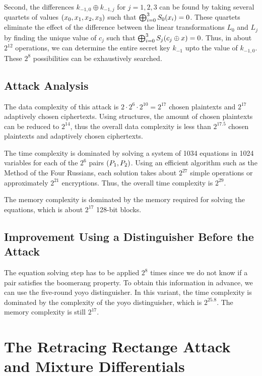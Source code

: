 \documentclass[twoside]{article}
\begin{document}
Second, the differences \(k_{-1, 0} \oplus k_{-1, j}\) for \(j = 1, 2, 3\) can
be found by taking several quartets of values \((x_0, x_1, x_2, x_3)\) such
that \(\bigoplus_{i=0}^3S_0(x_i) = 0\). These quartets eliminate the effect
of the difference between the linear transformations \(L_0\) and \(L_j\) by
finding the unique value of \(c_j\) such that \(\bigoplus_{i=0}^3 S_j(c_j
\oplus x) = 0\). Thus, in about \(2^{12}\) operations, we can determine the
entire secret key \(k_{-1}\) upto the value of \(k_{-1, 0}\). These \(2^8\)
possibilities can be exhaustively searched.

\subsection{Attack Analysis}
The data complexity of this attack is \(2 \cdot 2^6 \cdot 2^{10} = 2^{17}\)
chosen plaintexts and \(2^{17}\) adaptively chosen ciphertexts. Using
structures, the amount of chosen plaintexts can be reduced to \(2^{14}\), thus
the overall data complexity is less than \(2^{17.5}\) chosen plaintexts and
adaptively chosen ciphertexts.

The time complexity is dominated by solving a system of 1034 equations in 1024
variables for each of the \(2^6\) pairs \((P_1, P_2)\). Using an efficient
algorithm such as the Method of the Four Russians, each solution takes about
\(2^{27}\) simple operations or approximately \(2^{21}\) encryptions. Thus, the
overall time complexity is \(2^{29}\).

The memory complexity is dominated by the memory required for solving the
equations, which is about \(2^{17}\) 128-bit blocks.

\subsection{Improvement Using a Distinguisher Before the Attack}

The equation solving step has to be applied \(2^8\) times since we do not know
if a pair satisfies the boomerang property. To obtain this information in
advance, we can use the five-round yoyo distinguisher. In this variant, the time
complexity is dominated by the complexity of the yoyo distinguisher, which is
\(2^{25.8}\). The memory complexity is still \(2^{17}\).

\section{The Retracing Rectange Attack and Mixture Differentials}
\end{document}
